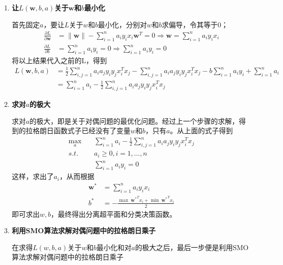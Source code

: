 \begin{enumerate}
	\item \textbf{让$L(\boldsymbol{w},b,a)$关于$\boldsymbol{w}$和$b$最小化}
	
	首先固定$a$，要让$L$关于$w$和$b$最小化，分别对$w$和$b$求偏导，令其等于0；
	\begin{equation}
	\begin{aligned}
	\frac{\partial L}{\partial \boldsymbol{w}} &= \lVert \boldsymbol{w}\rVert - \sum_{i = 1}^n a_iy_ix_i \boldsymbol{w}^T = 0 \Rightarrow  \boldsymbol{w} = \sum_{i = 1}^n a_iy_ix_i  \\
	\frac{\partial L}{\partial b} &= \sum_{i = 1}^n a_iy_i = 0\Rightarrow  \sum_{i = 1}^n a_iy_i  = 0
	\end{aligned}
	\end{equation}
	将以上结果代入之前的L，得到
	\begin{equation}
	\begin{aligned}
	L(\boldsymbol{w},b,a) &= \frac{1}{2}\sum_{i,j=1}^na_ia_jy_iy_jx_i^Tx_j - \sum_{i,j=1}^na_ia_jy_iy_jx_i^Tx_j - b\sum_{i = 1}^n a_iy_i + \sum_{i = 1}^na_i \\
	&= \sum _{i = 1}^n a_i - \frac{1}{2}\sum_{i,j=1}^na_ia_jy_iy_jx_i^Tx_j
	\end{aligned}
	\end{equation}
	\item \textbf{求对$a$的极大}
	
	求对$a$的极大，即是关于对偶问题的最优化问题。经过上一个步骤的求解，得到的拉格朗日函数式子已经没有了变量$w$和$b$，只有$a$。从上面的式子得到
	\begin{equation}
	\begin{aligned}
	\mathop{max}\limits_a \quad &\sum _{i = 1}^n a_i - \frac{1}{2}\sum_{i,j=1}^na_ia_jy_iy_jx_i^Tx_j \\
	s.t. \quad &a_i \geq 0,i = 1,\dots, n \\
	&\sum_{i = 1}^n a_iy_i  = 0
	\end{aligned}
	\end{equation}
	这样，求出了$a_i$，从而根据
	\begin{equation}
	\begin{aligned}
	\boldsymbol{w}^* &= \sum_{i = 1}^n a_iy_ix_i \\
	b^* &= -\frac{\mathop{max}\ {\boldsymbol{w}^*}^T x_i + \mathop{min}\ {\boldsymbol{w}^*}^T x_i}{2} 
	\end{aligned}
	\end{equation}
	即可求出$w,b$，最终得出分离超平面和分类决策函数。
	\item \textbf{利用SMO算法求解对偶问题中的拉格朗日乘子}
	
	在求得$L(w,b,a)$关于$w$和$b$最小化和对$a$的极大之后，最后一步便是利用SMO算法求解对偶问题中的拉格朗日乘子	
\end{enumerate}
